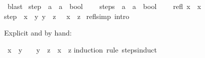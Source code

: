\begin{isabellebody}
\ blast\isanewline
{}\isamarkupfalse%
%
\endisatagproof
{\isafoldproof}%
%
\isadelimproof
%
\endisadelimproof
%
\isadelimdocument
%
\endisadelimdocument
%
\isatagdocument
%
\isamarkuptrue%
%
\endisatagdocument
{\isafolddocument}%
%
\isadelimdocument
%
\endisadelimdocument
{}\isamarkupfalse%
\ step\ {\isacharcolon}{\kern0pt}{\isacharcolon}{\kern0pt}\ {\isachardoublequoteopen}{\isacharprime}{\kern0pt}a\ {\isasymRightarrow}\ {\isacharprime}{\kern0pt}a\ {\isasymRightarrow}\ bool{\isachardoublequoteclose}\ {\isacharparenleft}{\kern0pt}\ {\isachardoublequoteopen}{\isasymrightarrow}{\isachardoublequoteclose}\ {}{}{\isacharparenright}{\kern0pt}\isanewline
\isanewline
{}\isamarkupfalse%
\ steps\ {\isacharcolon}{\kern0pt}{\isacharcolon}{\kern0pt}\ {\isachardoublequoteopen}{\isacharprime}{\kern0pt}a\ {\isasymRightarrow}\ {\isacharprime}{\kern0pt}a\ {\isasymRightarrow}\ bool{\isachardoublequoteclose}\ {\isacharparenleft}{\kern0pt}\ {\isachardoublequoteopen}{\isasymrightarrow}{\isacharasterisk}{\kern0pt}{\isachardoublequoteclose}\ {}{}{\isacharparenright}{\kern0pt}\ \isanewline
refl{\isacharcolon}{\kern0pt}\ {\isachardoublequoteopen}x\ {\isasymrightarrow}{\isacharasterisk}{\kern0pt}\ x{\isachardoublequoteclose}\ {\isacharbar}{\kern0pt}\isanewline
step{\isacharcolon}{\kern0pt}\ {\isachardoublequoteopen}{\isasymlbrakk}\ x\ {\isasymrightarrow}\ y{\isacharsemicolon}{\kern0pt}\ y\ {\isasymrightarrow}{\isacharasterisk}{\kern0pt}\ z\ {\isasymrbrakk}\ {\isasymLongrightarrow}\ x\ {\isasymrightarrow}{\isacharasterisk}{\kern0pt}\ z{\isachardoublequoteclose}\isanewline
\isanewline
{}\isamarkupfalse%
\ refl{\isacharbrackleft}{\kern0pt}simp{\isacharcomma}{\kern0pt}\ intro{\isacharbrackright}{\kern0pt}%
\begin{isamarkuptext}%
Explicit and by hand:%
\end{isamarkuptext}\isamarkuptrue%
\isamarkupfalse%
\ {\isachardoublequoteopen}x\ {\isasymrightarrow}{\isacharasterisk}{\kern0pt}\ y\ \ {\isasymLongrightarrow}\ \ y\ {\isasymrightarrow}{\isacharasterisk}{\kern0pt}\ z\ {\isasymLongrightarrow}\ x\ {\isasymrightarrow}{\isacharasterisk}{\kern0pt}\ z{\isachardoublequoteclose}\isanewline
%
\isadelimproof
%
\endisadelimproof
%
\isatagproof
{}\isamarkupfalse%
{\isacharparenleft}{\kern0pt}induction\ rule{\isacharcolon}{\kern0pt}\ steps{\isachardot}{\kern0pt}induct{\isacharparenright}{\kern0pt}\isanewline

\end{isabellebody}
